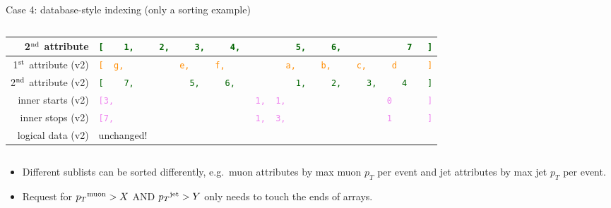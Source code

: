 \documentclass[aspectratio=169]{beamer}
\begin{document}
\begin{frame}{Case 4: database-style indexing (only a sorting example)}
\begin{columns}
\begin{tabular}{r l}
\small 2$^{\mbox{\scriptsize nd}}$ attribute & {\tt\scriptsize \textcolor{darkgreen}{[\ \ \ \ 1,\ \ \ \ \ 2,\ \ \ \ \ 3,\ \ \ \ \ 4,\ \ \ \ \ \ \ \ \ \ \ 5,\ \ \ \ \ 6,\ \ \ \ \ \ \ \ \ \ \ \ \ 7\ \ \ ]}} \\\hline
\small 1$^{\mbox{\scriptsize st}}$ attribute (v2) & {\tt\scriptsize \textcolor{darkorange}{[\ \ g,\ \ \ \ \ \ \ \ \ \ \ e,\ \ \ \ \ f,\ \ \ \ \ \ \ \ \ \ \ \ a,\ \ \ \ \ b,\ \ \ \ \ c,\ \ \ \ \ d\ \ \ \ \ \ ]}} \\
\small 2$^{\mbox{\scriptsize nd}}$ attribute (v2) & {\tt\scriptsize \textcolor{darkgreen}{[\ \ \ \ 7,\ \ \ \ \ \ \ \ \ \ \ 5,\ \ \ \ \ 6,\ \ \ \ \ \ \ \ \ \ \ \ 1,\ \ \ \ \ 2,\ \ \ \ \ 3,\ \ \ \ \ 4\ \ \ \ ]}} \\
\small inner starts (v2) & {\tt\scriptsize \textcolor{violet}{[3,\ \ \ \ \ \ \ \ \ \ \ \ \ \ \ \ \ \ \ \ \ \ \ \ \ \ \ \ 1,\ \ 1,\ \ \ \ \ \ \ \ \ \ \ \ \ \ \ \ \ \ \ \ 0\ \ \ \ \ \ \ ]}} \\
\small inner stops (v2)  & {\tt\scriptsize \textcolor{violet}{[7,\ \ \ \ \ \ \ \ \ \ \ \ \ \ \ \ \ \ \ \ \ \ \ \ \ \ \ \ 1,\ \ 3,\ \ \ \ \ \ \ \ \ \ \ \ \ \ \ \ \ \ \ \ 1\ \ \ \ \ \ \ ]}} \\\hline
\small logical data (v2) & unchanged! \\
\end{tabular}
\end{columns}

\vspace{0.25 cm}
\begin{itemize}
\item<2-> Different sublists can be sorted differently, e.g.\ muon attributes by max muon $p_T$ per event and jet attributes by max jet $p_T$ per event.
\item<3-> Request for ${p_T}^{\mbox{\scriptsize muon}} > X$ AND ${p_T}^{\mbox{\scriptsize jet}} > Y$ only needs to touch the ends of arrays.
\end{itemize}
\end{frame}
\end{document}

